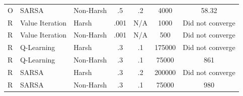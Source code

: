 \documentclass{amsart}
\begin{document}
\begin{table}
\begin{adjustbox}{width=1\textwidth}
\begin{tabular}{lllcccc}
        O & SARSA           & Non-Harsh   & .5              & .2           & 4000 & 58.32 \\
        R & Value Iteration & Harsh       & .001            & N/A           & 1000 & Did not converge \\
        R & Value Iteration & Non-Harsh   & .001              & N/A           & 500 & Did not converge \\
        R & Q-Learning      & Harsh       & .3              & .1           & 175000 & Did not converge \\
        R & Q-Learning      & Non-Harsh   & .3              & .1          & 75000 &  861 \\
        R & SARSA           & Harsh       & .3              & .2           & 200000 & Did not converge \\
        R & SARSA           & Non-Harsh   & .3              & .1           & 75000 & 980 \\



    \end{tabular}
    \end{adjustbox}
    \label{results_tab}
    \end{table}
\end{document}
